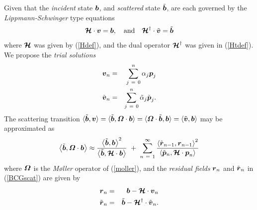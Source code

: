 Given that the {\em incident \/} state ${\bmi  b}$, and {\em scattered \/}
state $\tilde{\bmi  b}$, are each governed by the {\em Lippmann-Schwinger} 
type 
equations
\begin{equation} \label{primaldual}
{\CB H} \cdot  {\bmi  v} = {\bmi  b},\quad \mbox{and} \quad
{\CB H}^{\dagger} \cdot  \tilde{\bmi  v} = \tilde{\bmi  b}
\end{equation}
where ${\CB H}$ was given by (\ref{Hdef}), and the dual operator ${\CB 
H}^{\dagger}$ was given in (\ref{Htdef}).
We propose the {\em trial solutions\/}
\begin{eqnarray} \label{trialsolutions}
{\bmi  v}_{n}&=& \sum\limits_{  j\ =\ 0}^{ n } {\alpha }_{ 
 j}{ \bmi   p}_{  j}\\
{\tilde{\bmi  v}}_{n}&=& \sum\limits_{  j\ =\ 0}^{ n } 
{\tilde{\alpha }}_{  j}{\tilde{ \bmi   p}}_{  j}.
\end{eqnarray}
The scattering transition $\langle{\tilde{\bmi  b}, {\bmi  
v}}\rangle=
\langle{\tilde{\bmi  b}, {\bmi  \Omega} \cdot {\bmi  
b}}\rangle
= \langle{{\bmi  \Omega} \cdot\tilde{\bmi  b},  {\bmi  
b}}\rangle = \langle{\tilde{\bmi  v}, {\bmi  
b}}\rangle$ may be approximated as
\begin{equation} \label{BCGscat}
\left\langle{\tilde{\bmi  b}, {\bmi  \Omega} \cdot {\bmi  b}}\right\rangle 
\approx 
{\frac{{\left\langle{\tilde{\bmi  b},{\bmi  
b}}\right\rangle}^{2}}{\left\langle{\tilde{\bmi  b},{\CB H} 
\cdot {\bmi   b}}\right\rangle}}\ +\
\sum\limits_{  n\ =\ 1}^{ \infty } 
{\frac{\left\langle{{\tilde{ \bmi  r}}_{  n-1}  
,{\bmi  r}_{n-1}}\right\rangle^2}{\left\langle{\tilde{ \bmi  p}{}_{  
n}  ,{\CB H} \cdot { \bmi  p}_{  n}}\right\rangle}}
\end{equation} 
where ${\bmi  \Omega}$ is the {\em M{\o}ller\/} operator of 
(\ref{moller}), and
the {\em residual fields\/} ${\bmi  r}_{n}$ and $\tilde{\bmi  r}{}_{n}$ in 
(\ref{BCGscat})
are given by
\begin{eqnarray} \label{residuals}
{{\bmi  r}}_{n}&=& {{ \bmi   b}}  -{\CB H} \cdot {{  \bmi  v}}_{  
n}\nonumber\\ 
{\tilde{\bmi  r}}_{n}&=& {\tilde{ \bmi   b}}  -{\CB H}^{\dagger} \cdot 
{\tilde{\bmi  
v}}_{  n}. 
\end{eqnarray}

